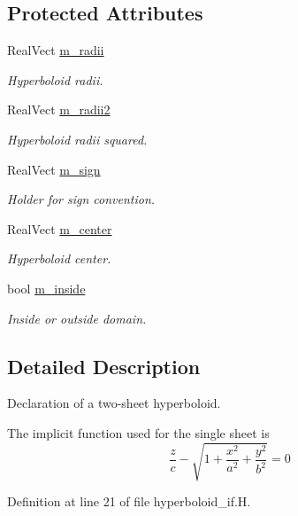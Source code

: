 \subsection*{Protected Attributes}
\begin{DoxyCompactItemize}
\item 
Real\+Vect \hyperlink{classhyperboloid__if_a40f58c885e633e217051a5f0f544189f}{m\+\_\+radii}
\begin{DoxyCompactList}\small\item\em Hyperboloid radii. \end{DoxyCompactList}\item 
Real\+Vect \hyperlink{classhyperboloid__if_aa173c15f1175222e2f8bf91ddb335df7}{m\+\_\+radii2}
\begin{DoxyCompactList}\small\item\em Hyperboloid radii squared. \end{DoxyCompactList}\item 
Real\+Vect \hyperlink{classhyperboloid__if_a48189ee705661052674df1e7745edc3f}{m\+\_\+sign}
\begin{DoxyCompactList}\small\item\em Holder for sign convention. \end{DoxyCompactList}\item 
Real\+Vect \hyperlink{classhyperboloid__if_aa5a7c54cb7bba001787b06a01c9d3d2c}{m\+\_\+center}
\begin{DoxyCompactList}\small\item\em Hyperboloid center. \end{DoxyCompactList}\item 
bool \hyperlink{classhyperboloid__if_a7ec285cac539bcb1e7bdecdcac6ffa7c}{m\+\_\+inside}
\begin{DoxyCompactList}\small\item\em Inside or outside domain. \end{DoxyCompactList}\end{DoxyCompactItemize}


\subsection{Detailed Description}
Declaration of a two-\/sheet hyperboloid. 

The implicit function used for the single sheet is \[ \frac{z}{c} - \sqrt{1 + \frac{x^2}{a^2} + \frac{y^2}{b^2}} = 0 \] 

Definition at line 21 of file hyperboloid\+\_\+if.\+H.



